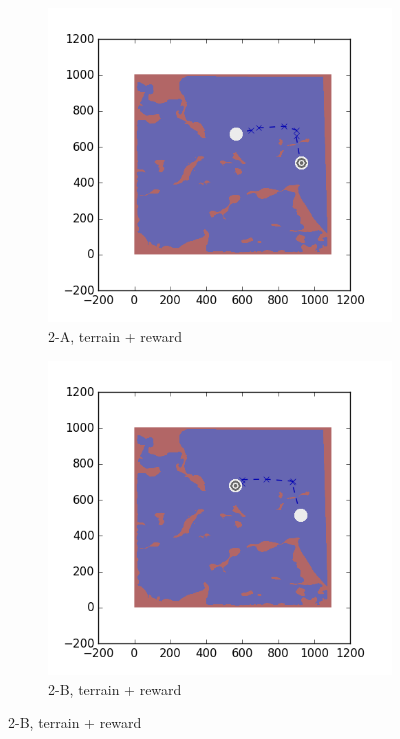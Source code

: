 \documentclass{tamuccthesis}
\begin{document}
\begin{figure}[H]
    \begin{subfigure}[b]{0.35\textwidth}
        \centering
        \includegraphics[width=\textwidth,trim={4cm 3cm 2cm 3cm},clip]{EXP3RG_PathBa_-1_-1_0_-1.png}
        \caption{\small{2-A, terrain + reward}}
        \label{fig:Path_2-A_terrain_reward}
    \end{subfigure}
    \hfill
    \begin{subfigure}[b]{0.35\textwidth}  
        \centering 
        \includegraphics[width=\textwidth,trim={4cm 3cm 2cm 3cm},clip]{EXP3RG_PathBb_-1_-1_0_-1.png}
        \caption{\small{2-B, terrain + reward}}
        \label{fig:Path_2-B_terrain_reward}
    \end{subfigure}
    

\end{figure}
\end{document}
